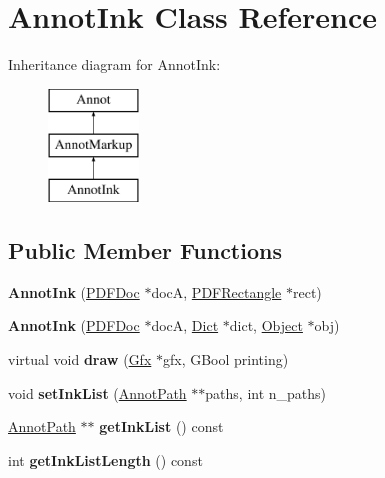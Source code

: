 \hypertarget{class_annot_ink}{}\section{Annot\+Ink Class Reference}
\label{class_annot_ink}
Inheritance diagram for Annot\+Ink\+:\begin{figure}[H]
\begin{center}
\leavevmode
\includegraphics[height=3.000000cm]{class_annot_ink}
\end{center}
\end{figure}
\subsection*{Public Member Functions}
\begin{DoxyCompactItemize}
\item 
\mbox{\label{class_annot_ink_afe0aadc56dc525ff00d3db6f5ccc72e6}} 
{\bfseries Annot\+Ink} (\hyperlink{class_p_d_f_doc}{P\+D\+F\+Doc} $\ast$docA, \hyperlink{class_p_d_f_rectangle}{P\+D\+F\+Rectangle} $\ast$rect)
\item 
\mbox{\label{class_annot_ink_ab3e35c9c0e5e0c9a7e5b78ee616d67b4}} 
{\bfseries Annot\+Ink} (\hyperlink{class_p_d_f_doc}{P\+D\+F\+Doc} $\ast$docA, \hyperlink{class_dict}{Dict} $\ast$dict, \hyperlink{class_object}{Object} $\ast$obj)
\item 
\mbox{\label{class_annot_ink_a8d6ec48c96e08131fee51c2d576021c7}} 
virtual void {\bfseries draw} (\hyperlink{class_gfx}{Gfx} $\ast$gfx, G\+Bool printing)
\item 
\mbox{\label{class_annot_ink_aba5f5093ea48e127d353ae47d474f59a}} 
void {\bfseries set\+Ink\+List} (\hyperlink{class_annot_path}{Annot\+Path} $\ast$$\ast$paths, int n\+\_\+paths)
\item 
\mbox{\label{class_annot_ink_ace4e3cfe6fd348bbd218af43e14afd1f}} 
\hyperlink{class_annot_path}{Annot\+Path} $\ast$$\ast$ {\bfseries get\+Ink\+List} () const
\item 
\mbox{\label{class_annot_ink_a0454a0128df3d41dc6f9e7b71ca05d39}} 
int {\bfseries get\+Ink\+List\+Length} () const
\end{DoxyCompactItemize}
